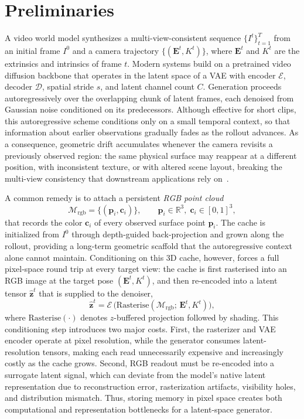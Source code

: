 \section{Preliminaries}
\label{sec:prelim}

A video world model synthesizes a multi-view-consistent sequence $\{I^t\}_{t=1}^{T}$ from an initial frame $I^0$ and a camera trajectory $\{(\mathbf{E}^t, K^t)\}$, where $\mathbf{E}^t$ and $K^t$ are the extrinsics and intrinsics of frame $t$.
Modern systems build on a pretrained video diffusion backbone that operates in the latent space of a VAE with encoder $\mathcal{E}$, decoder $\mathcal{D}$, spatial stride $s$, and latent channel count $C$.
Generation proceeds autoregressively over the overlapping chunk of latent frames, each denoised from Gaussian noise conditioned on its predecessors.
Although effective for short clips, this autoregressive scheme conditions only on a small temporal context, so that information about earlier observations gradually fades as the rollout advances.
As a consequence, geometric drift accumulates whenever the camera revisits a previously observed region: the same physical surface may reappear at a different position, with inconsistent texture, or with altered scene layout, breaking the multi-view consistency that downstream applications rely on~\cite{yang2024cogvideox, wan2025wan}.

A common remedy is to attach a persistent \emph{RGB point cloud}~\cite{zhao2026spatia, huang2025voyager, yu2024wonderworld}
\begin{equation}
\mathcal{M}_{\text{rgb}} = \bigl\{(\mathbf{p}_i, \mathbf{c}_i)\bigr\}, \qquad \mathbf{p}_i \in \mathbb{R}^3,\; \mathbf{c}_i \in [0, 1]^3,
\label{eq:rgb-mem}
\end{equation}
that records the color $\mathbf{c}_i$ of every observed surface point $\mathbf{p}_i$.
The cache is initialized from $I^0$ through depth-guided back-projection and grown along the rollout, providing a long-term geometric scaffold that the autoregressive context alone cannot maintain.
Conditioning on this 3D cache, however, forces a full pixel-space round trip at every target view: the cache is first rasterised into an RGB image at the target pose $(\mathbf{E}^t, K^t)$, and then re-encoded into a latent tensor $\hat{\mathbf{z}}^t$ that is supplied to the denoiser,
\begin{equation}
\hat{\mathbf{z}}^t = \mathcal{E}\,\!\bigl (\mathrm{Rasterise}(\mathcal{M}_{\text{rgb}};\, \mathbf{E}^t, K^t)\bigr),
\label{eq:rgb-read}
\end{equation}
where $\mathrm{Rasterise}(\cdot)$ denotes $z$-buffered projection followed by shading.
This conditioning step introduces two major costs. First, the rasterizer and VAE encoder operate at pixel resolution, while the generator consumes latent-resolution tensors, making each read unnecessarily expensive and increasingly costly as the cache grows. Second, RGB readout must be re-encoded into a surrogate latent signal, which can deviate from the model's native latent representation due to reconstruction error, rasterization artifacts, visibility holes, and distribution mismatch. Thus, storing memory in pixel space creates both computational and representation bottlenecks for a latent-space generator.


